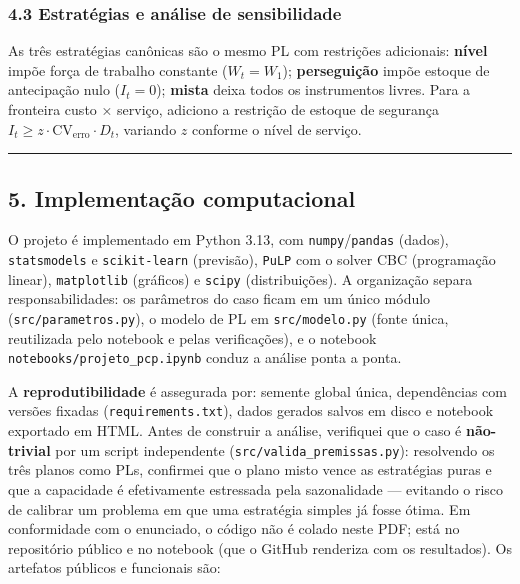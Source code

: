 \documentclass[
  brazilian,
  12pt,
]{article}
\begin{document}
\subsubsection{4.3 Estratégias e análise de
sensibilidade}\label{estratuxe9gias-e-anuxe1lise-de-sensibilidade}

As três estratégias canônicas são o mesmo PL com restrições adicionais:
\textbf{nível} impõe força de trabalho constante (\(W_t = W_1\));
\textbf{perseguição} impõe estoque de antecipação nulo (\(I_t = 0\));
\textbf{mista} deixa todos os instrumentos livres. Para a fronteira
custo × serviço, adiciono a restrição de estoque de segurança
\(I_t \ge z\cdot \mathrm{CV}_{\text{erro}}\cdot D_t\), variando \(z\)
conforme o nível de serviço.

\begin{center}\rule{0.5\linewidth}{0.5pt}\end{center}

\subsection{5. Implementação
computacional}\label{implementauxe7uxe3o-computacional}

O projeto é implementado em Python 3.13, com
\texttt{numpy}/\texttt{pandas} (dados), \texttt{statsmodels} e
\texttt{scikit-learn} (previsão), \texttt{PuLP} com o solver CBC
(programação linear), \texttt{matplotlib} (gráficos) e \texttt{scipy}
(distribuições). A organização separa responsabilidades: os parâmetros
do caso ficam em um único módulo (\texttt{src/parametros.py}), o modelo
de PL em \texttt{src/modelo.py} (fonte única, reutilizada pelo notebook
e pelas verificações), e o notebook
\texttt{notebooks/projeto\_pcp.ipynb} conduz a análise ponta a ponta.

A \textbf{reprodutibilidade} é assegurada por: semente global única,
dependências com versões fixadas (\texttt{requirements.txt}), dados
gerados salvos em disco e notebook exportado em HTML. Antes de construir
a análise, verifiquei que o caso é \textbf{não-trivial} por um script
independente (\texttt{src/valida\_premissas.py}): resolvendo os três
planos como PLs, confirmei que o plano misto vence as estratégias puras
e que a capacidade é efetivamente estressada pela sazonalidade ---
evitando o risco de calibrar um problema em que uma estratégia simples
já fosse ótima. Em conformidade com o enunciado, o código não é colado
neste PDF; está no repositório público e no notebook (que o GitHub
renderiza com os resultados). Os artefatos públicos e funcionais são:
\end{document}
